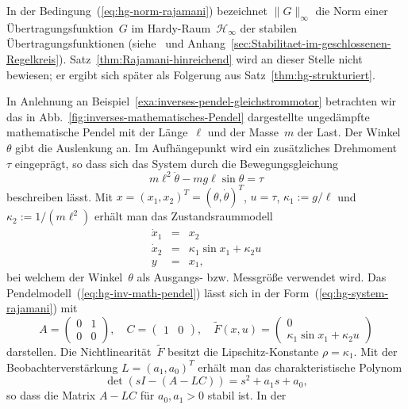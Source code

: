 In der Bedingung~(\ref{eq:hg-norm-rajamani}) bezeichnet $\|G\|_{\infty}$
die Norm einer Übertragungsfunktion~$G$ im Hardy-Raum~$\mathcal{H}_{\infty}$
der stabilen Übertragungsfunktionen (siehe~\cite{zhou1998} und Anhang~\ref{sec:Stabilitaet-im-geschlossenen-Regelkreis}).
Satz~\ref{thm:Rajamani-hinreichend} wird an dieser Stelle nicht
bewiesen; er ergibt sich später als Folgerung aus Satz~\ref{thm:hg-strukturiert}. 

\begin{example}
\label{exa:hg-inverses-pendel}In Anlehnung an Beispiel~\ref{exa:inverses-pendel-gleichstrommotor}
betrachten wir das in Abb.~\ref{fig:inverses-mathematisches-Pendel}
dargestellte ungedämpfte mathematische Pendel mit der Länge~$\ell$
und der Masse~$m$ der Last. Der Winkel~$\theta$ gibt die Auslenkung
an. Im Aufhängepunkt wird ein zusätzliches Drehmoment~$\tau$ eingeprägt,
so dass sich das System durch die Bewegungsgleichung 
\[
m\ell^{2}\ddot{\theta}-mg\ell\sin\theta=\tau
\]
beschreiben lässt. Mit $x=(x_{1},x_{2})^{T}=(\theta,\dot{\theta})^{T}$,
$u=\tau$, $\kappa_{1}:=g/\ell$ und $\kappa_{2}:=1/(m\ell^{2})$
erhält man das Zustands\-raum\-modell 
\begin{equation}
\begin{array}{lcl}
\dot{x}_{1} & = & x_{2}\\
\dot{x}_{2} & = & \kappa_{1}\sin x_{1}+\kappa_{2}u\\
y & = & x_{1},
\end{array}\label{eq:hg-inv-math-pendel}
\end{equation}
bei welchem der Winkel~$\theta$ als Ausgangs- bzw. Messgröße verwendet
wird. Das Pendelmodell~(\ref{eq:hg-inv-math-pendel}) lässt sich
in der Form~(\ref{eq:hg-system-rajamani}) mit
\[
A=\left(\begin{array}{cc}
0 & 1\\
0 & 0
\end{array}\right),\quad C=\left(\begin{array}{cc}
1 & 0\end{array}\right),\quad\widetilde{F}(x,u)=\left(\begin{array}{c}
0\\
\kappa_{1}\sin x_{1}+\kappa_{2}u
\end{array}\right)
\]
darstellen. Die Nichtlinearität~$\widetilde{F}$ besitzt die Lipschitz-Konstante
$\rho=\kappa_{1}$. Mit der Beobachterverstärkung $L=(a_{1},a_{0})^{T}$
erhält man das charakteristische Polynom
\[
\det(sI-(A-LC))=s^{2}+a_{1}s+a_{0},
\]
so dass die Matrix $A-LC$ für $a_{0},a_{1}>0$ stabil ist. In der

\end{example}
